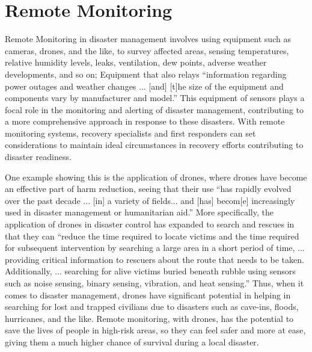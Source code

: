 \documentclass[conference]{IEEEtran}
\begin{document}
\section{Remote Monitoring} %

Remote Monitoring in disaster management involves using equipment such as cameras, drones, and the like, 
to survey affected areas, sensing temperatures, relative humidity levels, leaks, ventilation, dew points, 
adverse weather developments, and so on; Equipment that also relays ``information regarding power outages 
and weather changes ... [and] [t]he size of the equipment and components vary by manufacturer and 
model.'' \cite{b4} This equipment of sensors plays a focal role in the monitoring and alerting of disaster 
management, contributing to a more comprehensive approach in response to these disasters. With remote 
monitoring systems, recovery specialists and first responders can set considerations to maintain ideal 
circumstances in recovery efforts contributing to disaster readiness.\par

One example showing this is the application of drones, where drones have become an effective part of harm 
reduction, seeing that their use ``has rapidly evolved over the past decade ... [in] a variety of 
fields... and [has] becom[e] increasingly used in disaster management or humanitarian aid.'' \cite{b5} 
More specifically, the application of drones in disaster control has expanded to search and rescues in 
that they can ``reduce the time required to locate victims and the time required for subsequent intervention 
by searching a large area in a short period of time, ... providing critical information to rescuers about 
the route that needs to be taken. Additionally, ... searching for alive victims buried beneath rubble 
using sensors such as noise sensing, binary sensing, vibration, and heat sensing.'' \cite{b5} Thus, 
when it comes to disaster management, drones have significant potential in helping in searching for 
lost and trapped civilians due to disasters such as cave-ins, floods, hurricanes, and the like. Remote 
monitoring, with drones, has the potential to save the lives of people in high-risk areas, so they
can feel safer and more at ease, giving them a much higher chance of survival during a local disaster.\par
\end{document}
